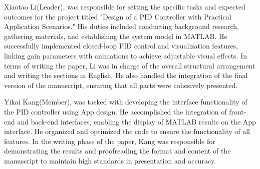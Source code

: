 \documentclass[journal,twoside,web]{ieeecolor}
\begin{document}
\vspace{-80ex} %
\begin{IEEEbiographynophoto}{Xiaotao Li(Leader),}
was responsible for setting the specific tasks and expected outcomes for the project titled "Design of a PID Controller with Practical Application Scenarios." His duties included conducting background research, gathering materials, and establishing the system model in MATLAB. He successfully implemented closed-loop PID control and visualization features, linking gain parameters with animations to achieve adjustable visual effects. In terms of writing the paper, Li was in charge of the overall structural arrangement and writing the sections in English. He also handled the integration of the final version of the manuscript, ensuring that all parts were cohesively presented.
\end{IEEEbiographynophoto}
\vspace{-90ex} %
\begin{IEEEbiographynophoto}{Yikai Kang(Member),}
was tasked with developing the interface functionality of the PID controller using App design. He accomplished the integration of front-end and back-end interfaces, enabling the display of MATLAB results on the App interface. He organized and optimized the code to ensure the functionality of all features. In the writing phase of the paper, Kang was responsible for demonstrating the results and proofreading the format and content of the manuscript to maintain high standards in presentation and accuracy.
\end{IEEEbiographynophoto}
\end{document}
